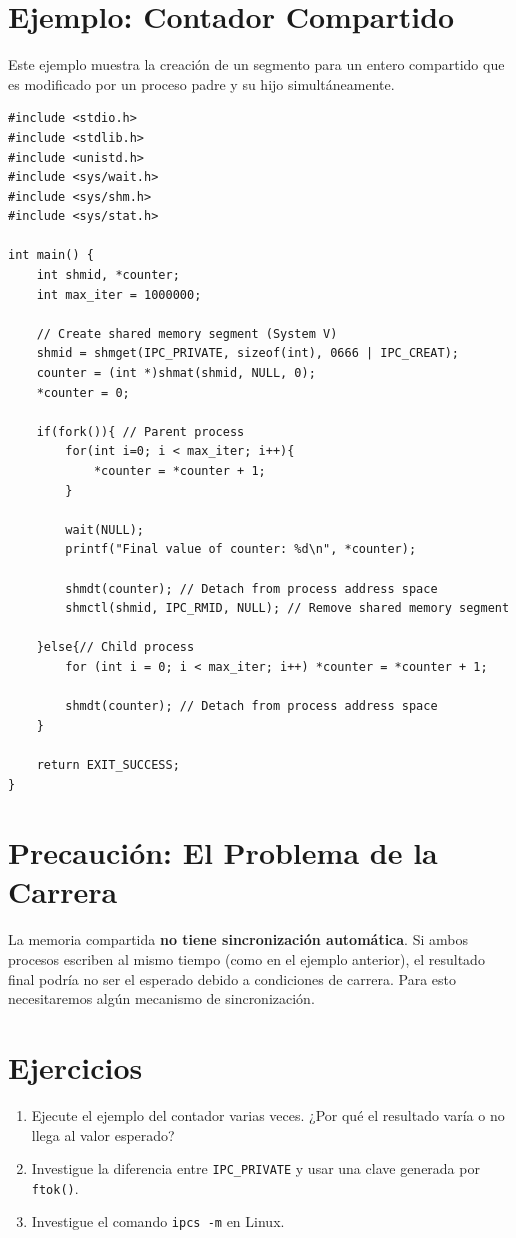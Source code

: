 \documentclass[12pt,a4paper]{article}
\begin{document}
\newpage

\section{Ejemplo: Contador Compartido}
Este ejemplo muestra la creación de un segmento para un entero compartido que es modificado por un proceso padre y su hijo simultáneamente.

\begin{lstlisting}
#include <stdio.h>
#include <stdlib.h>
#include <unistd.h>
#include <sys/wait.h>
#include <sys/shm.h>
#include <sys/stat.h>

int main() {
    int shmid, *counter;
    int max_iter = 1000000;

    // Create shared memory segment (System V)
    shmid = shmget(IPC_PRIVATE, sizeof(int), 0666 | IPC_CREAT);
    counter = (int *)shmat(shmid, NULL, 0);
    *counter = 0;

    if(fork()){ // Parent process
        for(int i=0; i < max_iter; i++){
            *counter = *counter + 1;
        } 

        wait(NULL);
        printf("Final value of counter: %d\n", *counter);

        shmdt(counter); // Detach from process address space
        shmctl(shmid, IPC_RMID, NULL); // Remove shared memory segment
        
    }else{// Child process
        for (int i = 0; i < max_iter; i++) *counter = *counter + 1;

        shmdt(counter); // Detach from process address space
    }

    return EXIT_SUCCESS;
}
\end{lstlisting}

\section{Precaución: El Problema de la Carrera}
La memoria compartida \textbf{no tiene sincronización automática}. Si ambos procesos escriben al mismo tiempo (como en el ejemplo anterior), el resultado final podría no ser el esperado debido a condiciones de carrera. Para esto necesitaremos algún mecanismo de sincronización.

\section{Ejercicios}
\begin{enumerate}
    \item Ejecute el ejemplo del contador varias veces. ¿Por qué el resultado varía o no llega al valor esperado?
    \item Investigue la diferencia entre \texttt{IPC\_PRIVATE} y usar una clave generada por \texttt{ftok()}.
    \item Investigue el comando \texttt{ipcs -m} en Linux.
\end{enumerate}
\end{document}
